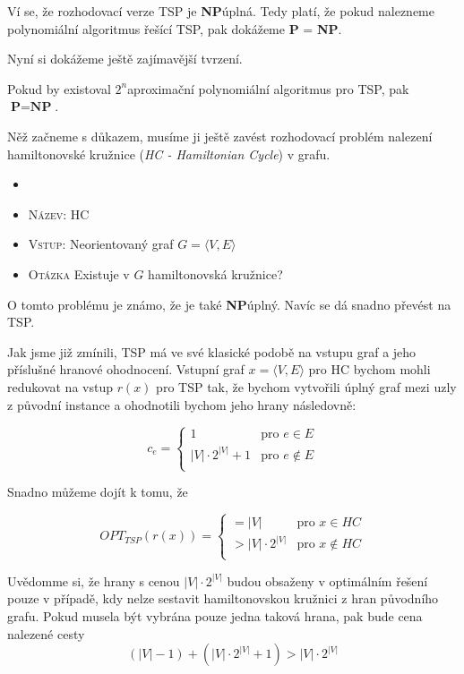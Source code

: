 \documentclass[
  printversion=false,
  joinlists=true,
  glossaries=true,
  figures=true,
  tables=true,
  sourcecodes=false,
  theorems=false,
  bibencoding=utf8,
  language=czech,
  encoding=utf8,
  program=infpvs,
  index=true,
  biblatex=true
]{kidiplom}
\begin{document}
Ví se, že rozhodovací verze TSP je \textbf{NP}\textendash úplná. Tedy platí, že pokud nalezneme polynomiální algoritmus řešící TSP, pak dokážeme \textbf{P} = \textbf{NP}.

Nyní si dokážeme ještě zajímavější tvrzení.
\begin{theorem}
Pokud by existoval $2^n$\textendash aproximační polynomiální algoritmus pro TSP, pak~$\textbf{P} = \textbf{NP}$.
\end{theorem}

Něž začneme s důkazem, musíme ji ještě zavést rozhodovací problém nalezení hamiltonovské kružnice (\textit{HC - Hamiltonian Cycle}) v grafu.
\begin{definition}[HC]
\begin{itemize}[label={}]
  \item
  \item \textsc{Název}: HC
  \item \textsc{Vstup}: Neorientovaný graf $G=\langle V, E \rangle$
  \item \textsc{Otázka} Existuje v $G$ hamiltonovská kružnice?
\end{itemize}
\end{definition}

O tomto problému je známo, že je také \textbf{NP}\textendash úplný. Navíc se dá snadno převést na TSP.

Jak jsme již zmínili, TSP má ve své klasické podobě na vstupu graf a jeho příslušné hranové ohodnocení. Vstupní graf $x = \langle V, E \rangle$ pro HC bychom mohli redukovat na vstup $r(x)$ pro TSP tak, že bychom vytvořili úplný graf mezi uzly z původní instance a ohodnotili bychom jeho hrany následovně:

$$c_e = \begin{cases}
1  & \text{pro } e \in E\\
|V|\cdot2^{|V|} + 1 & \text{pro } e \not\in E\\
\end{cases}$$

Snadno můžeme dojít k tomu, že

$$OPT_{TSP}(r(x)) = \begin{cases}
= |V|  & \text{pro } x \in HC\\
> |V|\cdot2^{|V|} & \text{pro } x \not\in HC\\
\end{cases}$$

Uvědomme si, že hrany s cenou $|V|\cdot2^{|V|}$ budou obsaženy v optimálním řešení pouze v případě, kdy nelze sestavit hamiltonovskou kružnici z hran původního grafu. Pokud musela být vybrána pouze jedna taková hrana, pak bude cena nalezené cesty $$(|V| - 1) + (|V|\cdot2^{|V|} + 1) > |V|\cdot2^{|V|}$$
\end{document}
